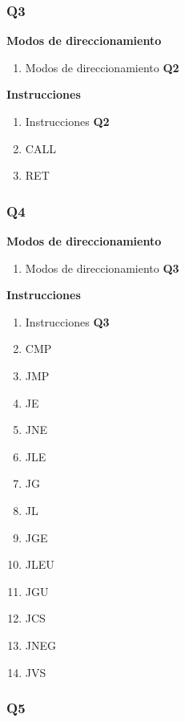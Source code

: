 \subsubsection{Q3}

\textbf{Modos de direccionamiento}
\begin{enumerate}
\item Modos de direccionamiento \textbf{Q2}
\end{enumerate}

\textbf{Instrucciones}
\begin{enumerate}
\item Instrucciones \textbf{Q2}
\item CALL
\item RET
\end{enumerate}

\subsubsection{Q4}

\textbf{Modos de direccionamiento}
\begin{enumerate}
\item Modos de direccionamiento \textbf{Q3}
\end{enumerate}

\textbf{Instrucciones}
\begin{enumerate}
\item Instrucciones \textbf{Q3}
\item CMP
\item JMP
\item JE 
\item JNE 
\item JLE 
\item JG 
\item JL 
\item JGE 
\item JLEU 
\item JGU 
\item JCS 
\item JNEG 
\item JVS
\end{enumerate}

\subsubsection{Q5}

